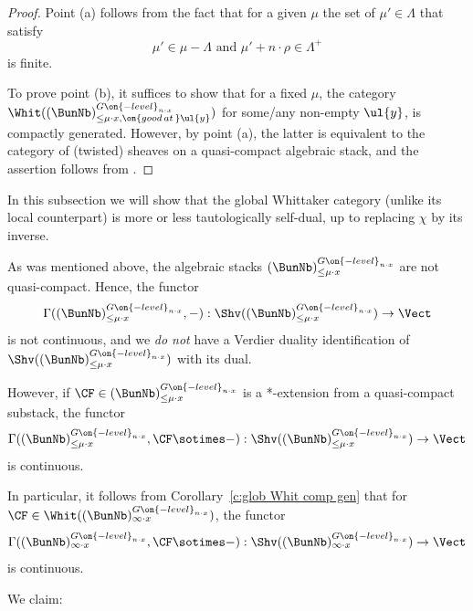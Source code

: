 \documentclass[9pt]{amsart}
\theoremstyle{definition}
\theoremstyle{remark}
\newcommand{\corref}[1]{Corollary~\ref{#1}}
\numberwithin{equation}{section}
\begin{document}
\begin{proof}

Point (a) follows from the fact that for a given $\mu$ the set of $\mu'\in \Lambda$ that satisfy
$$\mu' \in \mu-\Lambda \text{ and } \mu'+n\cdot \rho\in \Lambda^+$$
is finite.

\medskip

To prove point (b), it suffices to show that for a fixed $\mu$, the category
$\Whit((\BunNb)^{G\on{-level}_{n\cdot x}}_{\leq \mu\cdot x,\on{good\,at\,}\ul{y}})$ 
for some/any non-empty $\ul{y}$, is compactly generated. However, by point (a),
the latter is equivalent to the category of (twisted) sheaves on a quasi-compact algebraic stack,
and the assertion follows from \cite{DrGa}.

\end{proof}


In this subsection we will show that the global Whittaker category (unlike its local counterpart) is
more or less tautologically self-dual, up to replacing $\chi$ by its inverse. 

\sssec{}

As was mentioned above, the algebraic stacks $(\BunNb)^{G\on{-level}_{n\cdot x}}_{\leq \mu\cdot x}$ are not quasi-compact. Hence,
the functor
$$\Gamma((\BunNb)^{G\on{-level}_{n\cdot x}}_{\leq \mu\cdot x},-):\Shv((\BunNb)^{G\on{-level}_{n\cdot x}}_{\leq \mu\cdot x})\to \Vect$$
is not continuous, and we \emph{do not} have a Verdier duality identification of $\Shv((\BunNb)^{G\on{-level}_{n\cdot x}}_{\leq \mu\cdot x})$ 
with its dual.

\medskip

However, if $\CF\in (\BunNb)^{G\on{-level}_{n\cdot x}}_{\leq \mu\cdot x}$ is a *-extension from a quasi-compact substack, the functor 
$$\Gamma((\BunNb)^{G\on{-level}_{n\cdot x}}_{\leq \mu\cdot x},\CF\sotimes -):
\Shv((\BunNb)^{G\on{-level}_{n\cdot x}}_{\leq \mu\cdot x})\to \Vect$$
is continuous.

\medskip

In particular, it follows from \corref{c:glob Whit comp gen} that for 
$\CF\in \Whit((\BunNb)^{G\on{-level}_{n\cdot x}}_{\infty\cdot x})$, the functor 
$$\Gamma((\BunNb)^{G\on{-level}_{n\cdot x}}_{\infty\cdot x},\CF\sotimes -):\Shv((\BunNb)^{G\on{-level}_{n\cdot x}}_{\infty\cdot x})\to \Vect$$
is continuous.

\sssec{}

We claim:
\end{document}

